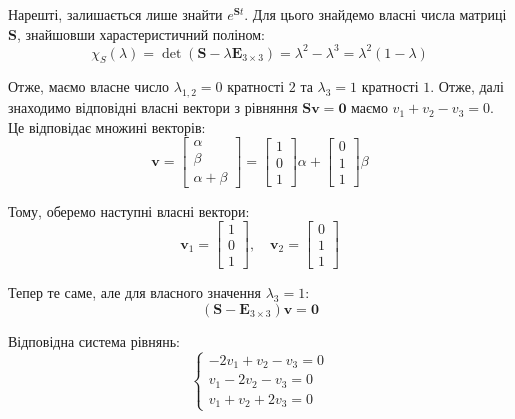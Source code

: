 \documentclass{hw_template}
\begin{document}
Нарешті, залишається лише знайти $e^{\boldsymbol{S}t}$. Для цього знайдемо власні числа
матриці $\boldsymbol{S}$, знайшовши харастеристичний поліном:
\begin{equation*}
    \chi_S(\lambda) = \det(\boldsymbol{S} - \lambda\boldsymbol{E}_{3 \times 3}) =
    \lambda^2 - \lambda^3 = \lambda^2(1-\lambda)
\end{equation*}

Отже, маємо власне число $\lambda_{1,2}=0$ кратності $2$ та $\lambda_3=1$
кратності $1$. Отже, далі знаходимо відповідні власні вектори з рівняння
$\boldsymbol{S}\mathbf{v} = \mathbf{0}$ маємо $v_1+v_2-v_3=0$. Це відповідає 
множині векторів:
\begin{equation*}
    \mathbf{v} = \begin{bmatrix}
        \alpha \\
        \beta \\ 
        \alpha+\beta
    \end{bmatrix} = \begin{bmatrix}
        1 \\ 0 \\ 1
    \end{bmatrix}\alpha + \begin{bmatrix}
        0 \\ 1 \\ 1
    \end{bmatrix}\beta
\end{equation*}

Тому, оберемо наступні власні вектори:
\begin{equation*}
    \mathbf{v}_1 = \begin{bmatrix}
        1 \\ 0 \\ 1
    \end{bmatrix}, \quad \mathbf{v}_2 = \begin{bmatrix}
        0 \\ 1 \\ 1
    \end{bmatrix}
\end{equation*}

Тепер те саме, але для власного значення $\lambda_3=1$:
\begin{equation*}
    (\boldsymbol{S} - \boldsymbol{E}_{3 \times 3})\mathbf{v} = \mathbf{0}
\end{equation*}

Відповідна система рівнянь:
\begin{equation*}
    \begin{cases}
        -2v_1 + v_2 - v_3 = 0 \\
        v_1 - 2v_2 - v_3 = 0 \\
        v_1 + v_2 + 2v_3 = 0
    \end{cases}
\end{equation*}
\end{document}
